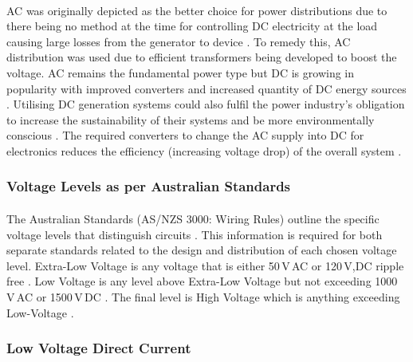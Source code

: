 \paragraph{}
AC was originally depicted as the better choice for power distributions due to there being no method at the time for controlling DC electricity at the load causing large losses from the generator to device \cite{Starke2008b}. To remedy this, AC distribution was used due to efficient transformers being developed to boost the voltage. AC remains the fundamental power type but DC is growing in popularity with improved converters and increased quantity of DC energy sources \cite{Starke2008b}. Utilising DC generation systems could also fulfil the power industry's obligation to increase the sustainability of their systems and be more environmentally conscious \cite{Starke2008a}. The required converters to change the AC supply into DC for electronics reduces the efficiency (increasing voltage drop) of the overall system \cite{Starke2008b}.    

\subsubsection{Voltage Levels as per Australian Standards}

\paragraph{}
The Australian Standards (AS/NZS 3000: Wiring Rules) outline the specific voltage levels that distinguish circuits \cite{StandardsAustralia2007}. This information is required for both separate standards related to the design and distribution of each chosen voltage level. Extra-Low Voltage is any voltage that is either 50\,V\,AC or 120\,V,DC ripple free \cite{StandardsAustralia2007}. Low Voltage is any level above Extra-Low Voltage but not exceeding 1000\,V\,AC or 1500\,V\,DC \cite{StandardsAustralia2007}. The final level is High Voltage which is anything exceeding Low-Voltage \cite{StandardsAustralia2007}.  


\subsubsection{Low Voltage Direct Current}

